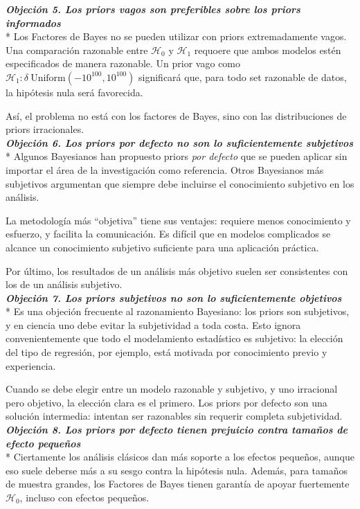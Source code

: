 \documentclass[a4paper,12pt]{article}
\begin{document}
{\slshape\bfseries Objeción 5. Los priors vagos son preferibles sobre los priors informados}\\*
Los Factores de Bayes no se pueden utilizar con priors extremadamente vagos. Una comparación razonable entre $\mathcal H_0 \mbox{ y } \mathcal H_1$ requoere que ambos modelos estén especificados de manera razonable. Un prior vago como $\mathcal H_1: \delta ~ \mbox{Uniform}(-10^{100}, 10^{100})$ significará que, para todo set razonable de datos, la hipótesis nula será favorecida.

Así, el problema no está con los factores de Bayes, sino con las distribuciones de priors irracionales.\\

{\slshape\bfseries Objeción 6. Los priors por defecto no son lo suficientemente subjetivos}\\*
Algunos Bayesianos han propuesto priors {\slshape por defecto} que se pueden aplicar sin importar el área de la investigación como referencia. Otros Bayesianos más subjetivos argumentan que siempre debe incluirse el conocimiento subjetivo en los análisis. 

La metodología más ``objetiva'' tiene sus ventajes: requiere menos conocimiento y esfuerzo, y facilita la comunicación. Es difícil que en modelos complicados se alcance un conocimiento subjetivo suficiente para una aplicación práctica. 

Por último, los resultados de un análisis más objetivo suelen ser consistentes con los de un análisis subjetivo.\\

{\slshape\bfseries Objeción 7. Los priors subjetivos no son lo suficientemente objetivos}\\*
Es una objeción frecuente al razonamiento Bayesiano: los priors son subjetivos, y en ciencia uno debe evitar la subjetividad a toda costa. Esto ignora convenientemente que todo el modelamiento estadístico es subjetivo: la elección del tipo de regresión, por ejemplo, está motivada por conocimiento previo y experiencia. 

Cuando se debe elegir entre un modelo razonable y subjetivo, y uno irracional pero objetivo, la elección clara es el primero. Los priors por defecto son una solución intermedia: intentan ser razonables sin requerir completa subjetividad.\\

{\slshape\bfseries Objeción 8. Los priors por defecto tienen prejuicio contra tamaños de efecto pequeños}\\*
Ciertamente los análisis clásicos dan más soporte a los efectos pequeños, aunque eso suele deberse más a su sesgo contra la hipótesis nula. Además, para tamaños de muestra grandes, los Factores de Bayes tienen garantía de apoyar fuertemente $\mathcal H_0$, incluso con efectos pequeños.
\end{document}
